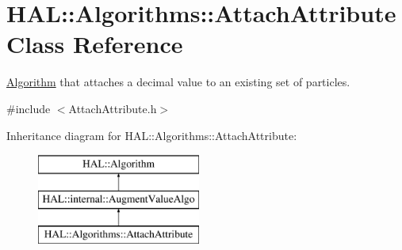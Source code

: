 \hypertarget{class_h_a_l_1_1_algorithms_1_1_attach_attribute}{\section{H\+A\+L\+:\+:Algorithms\+:\+:Attach\+Attribute Class Reference}
\label{class_h_a_l_1_1_algorithms_1_1_attach_attribute}
}


\hyperlink{class_h_a_l_1_1_algorithm}{Algorithm} that attaches a decimal value to an existing set of particles.  




{\ttfamily \#include $<$Attach\+Attribute.\+h$>$}

Inheritance diagram for H\+A\+L\+:\+:Algorithms\+:\+:Attach\+Attribute\+:\begin{figure}[H]
\begin{center}
\leavevmode
\includegraphics[height=3.000000cm]{class_h_a_l_1_1_algorithms_1_1_attach_attribute}
\end{center}
\end{figure}
